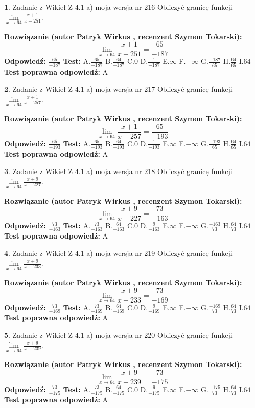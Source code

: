 \documentclass[12pt, a4paper]{article}
\theoremstyle{definition} %
\newtheorem{zad}{}
\newcommand{\zadStart}[1]{\begin{zad}#1\newline}
\newcommand{\zadStop}{\end{zad}}
\newcommand{\rozwStart}[2]{\noindent \textbf{Rozwiązanie (autor #1 , recenzent #2): }\newline}
\newcommand{\rozwStop}{\newline}
\newcommand{\odpStart}{\noindent \textbf{Odpowiedź:}\newline}
\newcommand{\odpStop}{\newline}
\newcommand{\testStart}{\noindent \textbf{Test:}\newline}
\newcommand{\testStop}{\newline}
\newcommand{\kluczStart}{\noindent \textbf{Test poprawna odpowiedź:}\newline}
\newcommand{\kluczStop}{\newline}
\begin{document}
\zadStart{Zadanie z Wikieł Z 4.1 a) moja wersja nr 216}
Obliczyć granicę funkcji $\lim\limits_{x\to64}\frac{x+1}{x-251}$.
\zadStop
\rozwStart{Patryk Wirkus}{Szymon Tokarski}
$$\lim\limits_{x\to64}\frac{x+1}{x-251} = \frac{65}{-187}$$
\rozwStop
\odpStart
$\frac{65}{-187}$
\odpStop
\testStart
A.$\frac{65}{-187}$
B.$\frac{64}{-187}$
C.$0$
D.$\frac{1}{-187}$
E.$\infty$
F.$-\infty$
G.$\frac{-187}{65}$
H.$\frac{64}{65}$
I.$64$
\testStop
\kluczStart
A
\kluczStop



\zadStart{Zadanie z Wikieł Z 4.1 a) moja wersja nr 217}
Obliczyć granicę funkcji $\lim\limits_{x\to64}\frac{x+1}{x-257}$.
\zadStop
\rozwStart{Patryk Wirkus}{Szymon Tokarski}
$$\lim\limits_{x\to64}\frac{x+1}{x-257} = \frac{65}{-193}$$
\rozwStop
\odpStart
$\frac{65}{-193}$
\odpStop
\testStart
A.$\frac{65}{-193}$
B.$\frac{64}{-193}$
C.$0$
D.$\frac{1}{-193}$
E.$\infty$
F.$-\infty$
G.$\frac{-193}{65}$
H.$\frac{64}{65}$
I.$64$
\testStop
\kluczStart
A
\kluczStop



\zadStart{Zadanie z Wikieł Z 4.1 a) moja wersja nr 218}
Obliczyć granicę funkcji $\lim\limits_{x\to64}\frac{x+9}{x-227}$.
\zadStop
\rozwStart{Patryk Wirkus}{Szymon Tokarski}
$$\lim\limits_{x\to64}\frac{x+9}{x-227} = \frac{73}{-163}$$
\rozwStop
\odpStart
$\frac{73}{-163}$
\odpStop
\testStart
A.$\frac{73}{-163}$
B.$\frac{64}{-163}$
C.$0$
D.$\frac{9}{-163}$
E.$\infty$
F.$-\infty$
G.$\frac{-163}{73}$
H.$\frac{64}{73}$
I.$64$
\testStop
\kluczStart
A
\kluczStop



\zadStart{Zadanie z Wikieł Z 4.1 a) moja wersja nr 219}
Obliczyć granicę funkcji $\lim\limits_{x\to64}\frac{x+9}{x-233}$.
\zadStop
\rozwStart{Patryk Wirkus}{Szymon Tokarski}
$$\lim\limits_{x\to64}\frac{x+9}{x-233} = \frac{73}{-169}$$
\rozwStop
\odpStart
$\frac{73}{-169}$
\odpStop
\testStart
A.$\frac{73}{-169}$
B.$\frac{64}{-169}$
C.$0$
D.$\frac{9}{-169}$
E.$\infty$
F.$-\infty$
G.$\frac{-169}{73}$
H.$\frac{64}{73}$
I.$64$
\testStop
\kluczStart
A
\kluczStop



\zadStart{Zadanie z Wikieł Z 4.1 a) moja wersja nr 220}
Obliczyć granicę funkcji $\lim\limits_{x\to64}\frac{x+9}{x-239}$.
\zadStop
\rozwStart{Patryk Wirkus}{Szymon Tokarski}
$$\lim\limits_{x\to64}\frac{x+9}{x-239} = \frac{73}{-175}$$
\rozwStop
\odpStart
$\frac{73}{-175}$
\odpStop
\testStart
A.$\frac{73}{-175}$
B.$\frac{64}{-175}$
C.$0$
D.$\frac{9}{-175}$
E.$\infty$
F.$-\infty$
G.$\frac{-175}{73}$
H.$\frac{64}{73}$
I.$64$
\testStop
\kluczStart
A
\kluczStop
\end{document}
